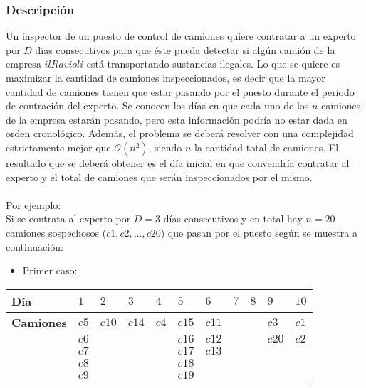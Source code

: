 \documentclass[11pt, a4paper, twoside]{article}
\begin{document}
{}

\subsubsection{Descripción}
Un inspector de un puesto de control de camiones quiere contratar a un experto por $D$ d\'ias consecutivos para que \'este pueda detectar si alg\'un cami\'on de la empresa $il Ravioli$ est\'a transportando sustancias ilegales. Lo que se quiere es maximizar la cantidad de camiones inspeccionados, es decir que la mayor cantidad de camiones tienen que estar pasando por el puesto durante el per\'iodo de contraci\'on del experto. Se conocen los d\'ias en que cada uno de los $n$ camiones de la empresa estar\'an pasando, pero esta informaci\'on podr\'ia no estar dada en orden cronol\'ogico. Adem\'as, el problema se deber\'a resolver con una complejidad estrictamente mejor que $\mathcal{O}(n^{2})$, siendo $n$ la cantidad total de camiones. El resultado que se deber\'a obtener es el d\'ia inicial en que convendr\'ia contratar al experto y el total de camiones que ser\'an inspeccionados por el mismo.\\
\\
Por ejemplo: 
\\
Si se contrata al experto por $D=3$ d\'ias consecutivos y en total hay $n=20$ camiones sospechosos ($c1,c2,...,c20$) que pasan por el puesto seg\'un se muestra a continuaci\'on: \\ 

\begin{itemize}
\item Primer caso:
\end{itemize} 

\begin{tabular}{|l|l|l|l|l|l|l|l|l|l|l|}
\hline
\bf Día      &  $1$  & $2$   & $3$   & $4$   & $5$   & $6$ & $7$ & $8$ & $9$   & $10$  \\
\hline
\bf Camiones &  $c5$ & $c10$ & $c14$ & $c4$  & $c15$ & $c11$ &   &     & $c3$  & $c1$  \\
	         &  $c6$ &       &       &       & $c16$ & $c12$ &   &     & $c20$ & $c2$  \\    
			 &	$c7$ &       &       &       & $c17$ & $c13$ &   &     &       &       \\  
			 &	$c8$ &       &       &       & $c18$ &       &   &     &       &       \\
			 &	$c9$ &       &       &       & $c19$ &       &   &     &       &       \\
\hline
\end{tabular} \\
\end{document}
